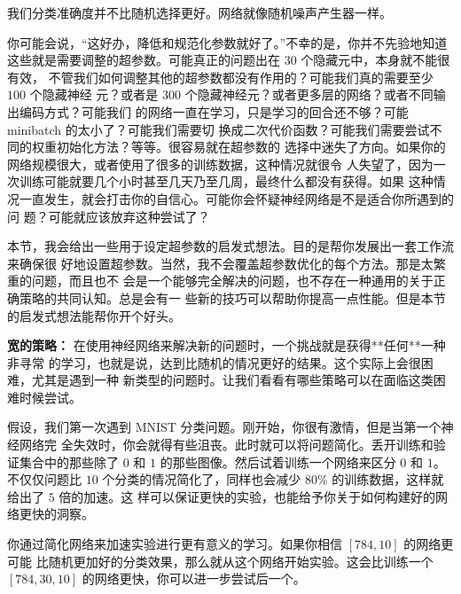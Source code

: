 我们分类准确度并不比随机选择更好。网络就像随机噪声产生器一样。

你可能会说，“这好办，降低\learningrate{}和规范化参数就好了。”不幸的是，你并不先验地知道
这些就是需要调整的超参数。可能真正的问题出在 $30$ 个隐藏元中，本身就不能很有效，
不管我们如何调整其他的超参数都没有作用的？可能我们真的需要至少 $100$ 个隐藏神经
元？或者是 $300$ 个隐藏神经元？或者更多层的网络？或者不同输出编码方式？可能我们
的网络一直在学习，只是学习的回合还不够？可能 minibatch 的太小了？可能我们需要切
换成二次代价函数？可能我们需要尝试不同的权重初始化方法？等等。很容易就在超参数的
选择中迷失了方向。如果你的网络规模很大，或者使用了很多的训练数据，这种情况就很令
人失望了，因为一次训练可能就要几个小时甚至几天乃至几周，最终什么都没有获得。如果
这种情况一直发生，就会打击你的自信心。可能你会怀疑神经网络是不是适合你所遇到的问
题？可能就应该放弃这种尝试了？

本节，我会给出一些用于设定超参数的启发式想法。目的是帮你发展出一套工作流来确保很
好地设置超参数。当然，我不会覆盖超参数优化的每个方法。那是太繁重的问题，而且也不
会是一个能够完全解决的问题，也不存在一种通用的关于正确策略的共同认知。总是会有一
些新的技巧可以帮助你提高一点性能。但是本节的启发式想法能帮你开个好头。

\textbf{宽的策略：} 在使用神经网络来解决新的问题时，一个挑战就是获得**任何**一种非寻常
的学习，也就是说，达到比随机的情况更好的结果。这个实际上会很困难，尤其是遇到一种
新类型的问题时。让我们看看有哪些策略可以在面临这类困难时候尝试。

假设，我们第一次遇到 MNIST 分类问题。刚开始，你很有激情，但是当第一个神经网络完
全失效时，你会就得有些沮丧。此时就可以将问题简化。丢开训练和验证集合中的那些除了
$0$ 和 $1$ 的那些图像。然后试着训练一个网络来区分 $0$ 和 $1$。不仅仅问题比 $10$
个分类的情况简化了，同样也会减少 80\% 的训练数据，这样就给出了 $5$ 倍的加速。这
样可以保证更快的实验，也能给予你关于如何构建好的网络更快的洞察。

你通过简化网络来加速实验进行更有意义的学习。如果你相信 $[784, 10]$ 的网络更可能
比随机更加好的分类效果，那么就从这个网络开始实验。这会比训练一个 $[784, 30 ,10]$
的网络更快，你可以进一步尝试后一个。


